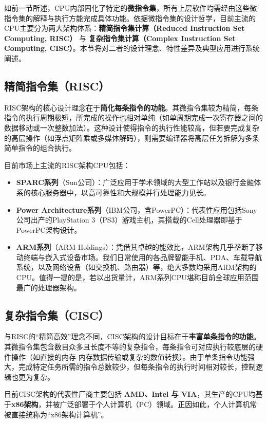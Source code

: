 \documentclass[12pt,UTF8]{ctexbook}
\begin{document}
如前一节所述，CPU内部固化了特定的\textbf{微指令集}，所有上层软件均需经由这些微指令集的解释与执行方能完成具体功能。依据微指令集的设计哲学，目前主流的CPU主要分为两大架构体系：\textbf{精简指令集计算（Reduced Instruction Set Computing, RISC）} 与 \textbf{复杂指令集计算（Complex Instruction Set Computing, CISC）}。本节将对二者的设计理念、特性差异及典型应用进行系统阐述。

\subsection{精简指令集（RISC）}

RISC架构的核心设计理念在于\textbf{简化每条指令的功能}。其微指令集较为精简，每条指令的执行周期极短，所完成的操作也相对单纯（如单周期完成一次寄存器之间的数据移动或一次整数加法）。这种设计使得指令的执行性能较高，但若要完成复杂的高层操作（如浮点矩阵乘或多媒体解码），则需要编译器将高层任务拆解为多条简单指令的组合执行。

目前市场上主流的RISC架构CPU包括：

\begin{itemize}
\item \textbf{SPARC系列}（Sun公司）：广泛应用于学术领域的大型工作站以及银行金融体系的核心服务器中，以高可靠性和大规模并行处理能力见长。
\item \textbf{Power Architecture系列}（IBM公司，含PowerPC）：代表性应用包括Sony公司出产的PlayStation 3（PS3）游戏主机，其搭载的Cell处理器即基于PowerPC架构设计。
\item \textbf{ARM系列}（ARM Holdings）：凭借其卓越的能效比，ARM架构几乎垄断了移动终端与嵌入式设备市场。我们日常使用的各品牌智能手机、PDA、车载导航系统，以及网络设备（如交换机、路由器）等，绝大多数均采用ARM架构的CPU。值得一提的是，若以出货量计，ARM系列CPU堪称目前全球应用范围最广的处理器架构\cite{ARM_popular}。
\end{itemize}

\subsection{复杂指令集（CISC）}

与RISC的“精简高效”理念不同，CISC架构的设计目标在于\textbf{丰富单条指令的功能}。其微指令集包含数目众多且长度不等的复杂指令，每条指令可对应执行较底层的硬件操作（如直接的内存-内存数据传输或复杂的数值转换）。由于单条指令功能强大，完成特定任务所需的指令总数较少，但每条指令的执行时间相对较长，控制逻辑也更为复杂。

目前CISC架构的代表性厂商主要包括 \textbf{AMD、Intel 与 VIA}，其生产的CPU均基于\textbf{x86架构}，并被广泛部署于个人计算机（PC）领域。正因如此，个人计算机常被直接统称为“x86架构计算机”。
\end{document}
